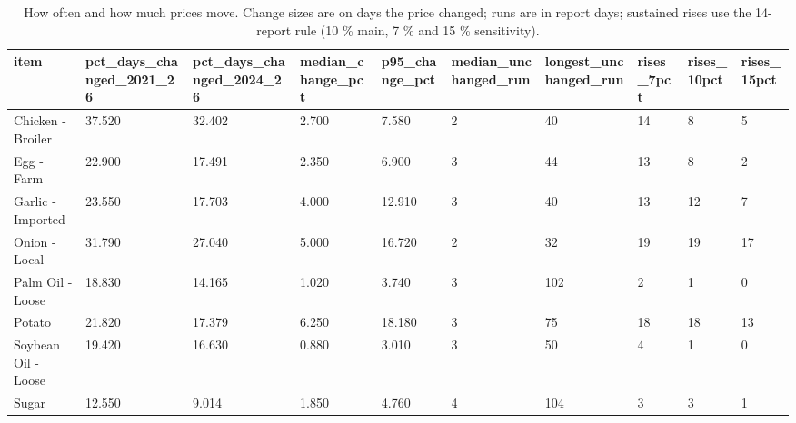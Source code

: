 \begin{table}
\caption{How often and how much prices move. Change sizes are on days the price changed; runs are in report days; sustained rises use the 14-report rule (10 \% main, 7 \% and 15 \% sensitivity).}
\label{tab:r2}
\begin{tabular}{llllllllll}
\toprule
item & pct\_days\_changed\_2021\_26 & pct\_days\_changed\_2024\_26 & median\_change\_pct & p95\_change\_pct & median\_unchanged\_run & longest\_unchanged\_run & rises\_7pct & rises\_10pct & rises\_15pct \\
\midrule
Chicken - Broiler & 37.520 & 32.402 & 2.700 & 7.580 & 2 & 40 & 14 & 8 & 5 \\
Egg - Farm & 22.900 & 17.491 & 2.350 & 6.900 & 3 & 44 & 13 & 8 & 2 \\
Garlic - Imported & 23.550 & 17.703 & 4.000 & 12.910 & 3 & 40 & 13 & 12 & 7 \\
Onion - Local & 31.790 & 27.040 & 5.000 & 16.720 & 2 & 32 & 19 & 19 & 17 \\
Palm Oil - Loose & 18.830 & 14.165 & 1.020 & 3.740 & 3 & 102 & 2 & 1 & 0 \\
Potato & 21.820 & 17.379 & 6.250 & 18.180 & 3 & 75 & 18 & 18 & 13 \\
Soybean Oil - Loose & 19.420 & 16.630 & 0.880 & 3.010 & 3 & 50 & 4 & 1 & 0 \\
Sugar & 12.550 & 9.014 & 1.850 & 4.760 & 4 & 104 & 3 & 3 & 1 \\
\bottomrule
\end{tabular}
\end{table}
